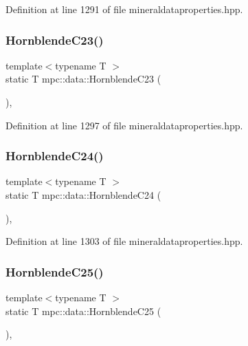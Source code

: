 Definition at line 1291 of file mineraldataproperties.\+hpp.

\mbox{\label{namespacempc_1_1data_a9b42f9362bf0b8bddc93f6911b0e717b}} 
\subsubsection{\texorpdfstring{Hornblende\+C23()}{HornblendeC23()}}
{\footnotesize\ttfamily template$<$typename T $>$ \\
static T mpc\+::data\+::\+Hornblende\+C23 (\begin{DoxyParamCaption}{ }\end{DoxyParamCaption})\hspace{0.3cm}{\ttfamily [inline]}, {\ttfamily [static]}}



Definition at line 1297 of file mineraldataproperties.\+hpp.

\mbox{\label{namespacempc_1_1data_a455bfb677c7c7e290247dd48908ab017}} 
\subsubsection{\texorpdfstring{Hornblende\+C24()}{HornblendeC24()}}
{\footnotesize\ttfamily template$<$typename T $>$ \\
static T mpc\+::data\+::\+Hornblende\+C24 (\begin{DoxyParamCaption}{ }\end{DoxyParamCaption})\hspace{0.3cm}{\ttfamily [inline]}, {\ttfamily [static]}}



Definition at line 1303 of file mineraldataproperties.\+hpp.

\mbox{\label{namespacempc_1_1data_ab66bbf01d7d0864eb98b3fa93260a745}} 
\subsubsection{\texorpdfstring{Hornblende\+C25()}{HornblendeC25()}}
{\footnotesize\ttfamily template$<$typename T $>$ \\
static T mpc\+::data\+::\+Hornblende\+C25 (\begin{DoxyParamCaption}{ }\end{DoxyParamCaption})\hspace{0.3cm}{\ttfamily [inline]}, {\ttfamily [static]}}



